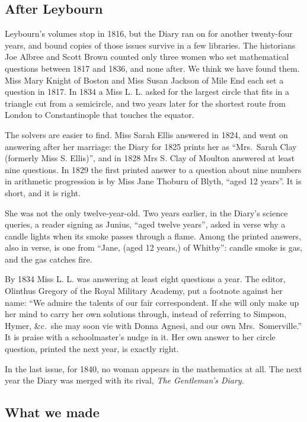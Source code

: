 \documentclass[11pt,a4paper]{article}
\begin{document}
\hypertarget{after-leybourn}{%
\subsection{After Leybourn}\label{after-leybourn}}

Leybourn's volumes stop in 1816, but the Diary ran on for another
twenty-four years, and bound copies of those issues survive in a few
libraries. The historians Joe Albree and Scott Brown counted only three
women who set mathematical questions between 1817 and 1836, and none
after. We think we have found them. Miss Mary Knight of Boston and Miss
Susan Jackson of Mile End each set a question in 1817. In 1834 a Miss L.
L. asked for the largest circle that fits in a triangle cut from a
semicircle, and two years later for the shortest route from London to
Constantinople that touches the equator.

The solvers are easier to find. Miss Sarah Ellis answered in 1824, and
went on answering after her marriage: the Diary for 1825 prints her as
``Mrs.~Sarah Clay (formerly Miss S. Ellis)'', and in 1828 Mrs S. Clay of
Moulton answered at least nine questions. In 1829 the first printed
answer to a question about nine numbers in arithmetic progression is by
Miss Jane Thoburn of Blyth, ``aged 12 years''. It is short, and it is
right.

She was not the only twelve-year-old. Two years earlier, in the Diary's
science queries, a reader signing as Junius, ``aged twelve years'',
asked in verse why a candle lights when its smoke passes through a
flame. Among the printed answers, also in verse, is one from ``Jane,
(aged 12 years,) of Whitby'': candle smoke is gas, and the gas catches
fire.

By 1834 Miss L. L. was answering at least eight questions a year. The
editor, Olinthus Gregory of the Royal Military Academy, put a footnote
against her name: ``We admire the talents of our fair correspondent. If
she will only make up her mind to carry her own solutions through,
instead of referring to Simpson, Hymer, \&c.~she may soon vie with Donna
Agnesi, and our own Mrs.~Somerville.'' It is praise with a
schoolmaster's nudge in it. Her own answer to her circle question,
printed the next year, is exactly right.

In the last issue, for 1840, no woman appears in the mathematics at all.
The next year the Diary was merged with its rival, \emph{The Gentleman's
Diary}.

\hypertarget{what-we-made}{%
\subsection{What we made}\label{what-we-made}}
\end{document}
